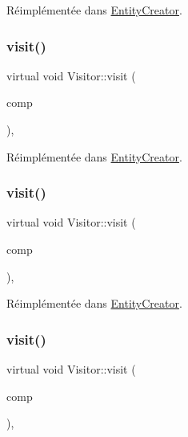 Réimplémentée dans \hyperlink{classEntityCreator_aaa96ee2442660da23e34a1f0cec3fa47}{Entity\+Creator}.

\mbox{\label{classVisitor_a6bcc6c971d8ba324024e3cf8e06e3751}} 
\subsubsection{\texorpdfstring{visit()}{visit()}\hspace{0.1cm}{\footnotesize\ttfamily [3/5]}}
{\footnotesize\ttfamily virtual void Visitor\+::visit (\begin{DoxyParamCaption}\item[{\hyperlink{structAttackComponent}{Attack\+Component} \&}]{comp }\end{DoxyParamCaption})\hspace{0.3cm}{\ttfamily [inline]}, {\ttfamily [virtual]}}



Réimplémentée dans \hyperlink{classEntityCreator_a48a6a070dee113ccf56916c0077845c1}{Entity\+Creator}.

\mbox{\label{classVisitor_a05ce14929a5c30d182b46f8843605468}} 
\subsubsection{\texorpdfstring{visit()}{visit()}\hspace{0.1cm}{\footnotesize\ttfamily [4/5]}}
{\footnotesize\ttfamily virtual void Visitor\+::visit (\begin{DoxyParamCaption}\item[{\hyperlink{structArmorComponent}{Armor\+Component} \&}]{comp }\end{DoxyParamCaption})\hspace{0.3cm}{\ttfamily [inline]}, {\ttfamily [virtual]}}



Réimplémentée dans \hyperlink{classEntityCreator_af23e7656c8ee20319bd890aad99a6996}{Entity\+Creator}.

\mbox{\label{classVisitor_a42ce8ce5e7c789dc4b919a088e68829b}} 
\subsubsection{\texorpdfstring{visit()}{visit()}\hspace{0.1cm}{\footnotesize\ttfamily [5/5]}}
{\footnotesize\ttfamily virtual void Visitor\+::visit (\begin{DoxyParamCaption}\item[{\hyperlink{structSpeedComponent}{Speed\+Component} \&}]{comp }\end{DoxyParamCaption})\hspace{0.3cm}{\ttfamily [inline]}, {\ttfamily [virtual]}}



